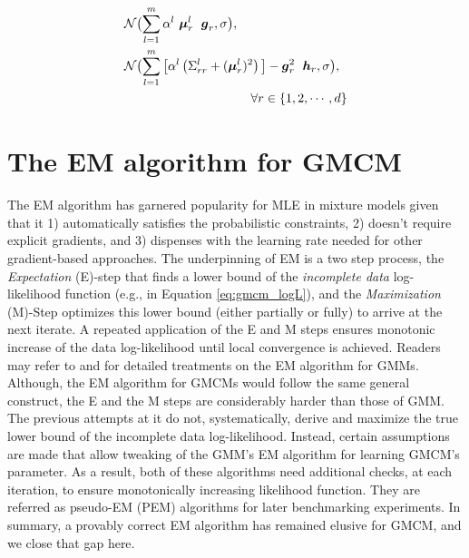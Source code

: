 \documentclass{article}
\theoremstyle{plain}
\theoremstyle{definition}
\theoremstyle{remark}
\begin{document}
\begin{align}
& \mathcal{N}\bigl(\sum_{l=1}^m \alpha^l \ \bs{\mu}_r^l \;\ \bs{g}_r,\sigma \bigr),  \label{eq:identifiability_prior_1} \\
&\mathcal{N}\bigl(\sum_{l=1}^m \big[ \alpha^l \left(\Sigma_{rr}^l+(\bs{\mu}_r^l)^2\right)\big] -\bs{g}_r^2 \; \ \bs{h}_r, \sigma \bigr), \label{eq:identifiability_priori_2}\\
&\qquad \qquad \qquad \qquad \qquad \forall r \in \{1,2,\cdots,d\} \nonumber
\end{align}

\section{The EM algorithm for GMCM}\label{sec:EM}
The EM algorithm has garnered popularity for MLE in mixture models given that it 1) automatically satisfies the probabilistic constraints, 2) doesn't require explicit gradients, and 3) dispenses with the learning rate needed for other gradient-based approaches. The underpinning of EM is a two step process, the \emph{Expectation} (E)-step that finds a lower bound of the \emph{incomplete data} log-likelihood function (e.g., in Equation \eqref{eq:gmcm_logL}), and the \emph{Maximization} (M)-Step optimizes this lower bound (either partially or fully) to arrive at the next iterate. A repeated application of the E and M steps ensures monotonic increase of the data log-likelihood until local convergence is achieved. Readers may refer to \citet{Bilmes98agentle} and \citet{Salakhutdinov2002} for detailed treatments on the EM algorithm for GMMs. Although, the EM algorithm for GMCMs would follow the same general construct, the E and the M steps are considerably harder than those of GMM. The previous attempts at it \citep{Tewari2011, Bhattacharya2014} do not, systematically, derive and maximize the true lower bound of the incomplete data log-likelihood. Instead, certain assumptions are made that allow tweaking of the GMM's EM algorithm for learning GMCM's parameter. As a result, both of these algorithms need additional checks, at each iteration, to ensure monotonically increasing likelihood function. They are referred as pseudo-EM (PEM) algorithms for later benchmarking experiments. In summary, a provably correct EM algorithm has remained elusive for GMCM, and we close that gap here.
\end{document}
